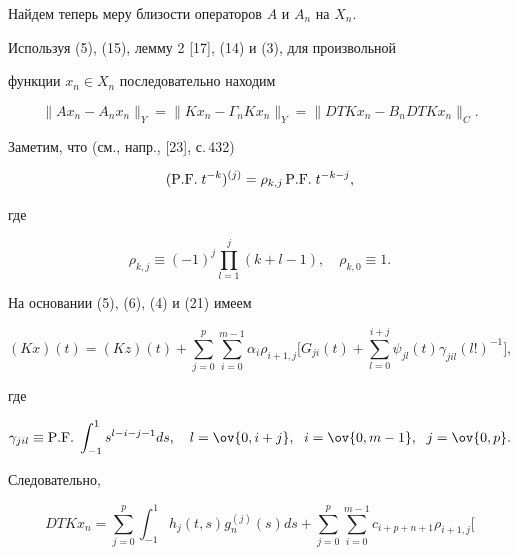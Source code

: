 \begin{pf}
 


Найдем теперь меру близости операторов $A$ и $A_n$ на $X_n$. 


Используя (5), (15), лемму 2 [17], (14) и (3), для произвольной 


функции $x_n\in X_n$ последовательно находим 


\begin{equation} 


\|Ax_n-A_n x_n\|_Y=\|K x_n-\Gamma_n K x_n\|_Y= 


\|D T K x_n-B_n D T K x_n\|_C. 


\end{equation} 


 


Заметим, что (см., напр., [23], с.\,432) 


\begin{equation} 


(\PF t^{-k})^{(j)}=\rho_{k,j}\,\PF t^{-k-j}, 


\end{equation} 


где 


$$ 


\rho_{k,j}\equiv(-1)^j\prod^j_{l=1}(k+l-1),\quad \rho_{k,0}\equiv1. 


$$ 


 


На основании (5), (6), (4) и (21) имеем 


$$ 


(K x)(t)=(K z)(t)+\sum^p_{j=0}\sum^{m-1}_{i=0}\alpha_i\rho_{i+1,j} 


\bigg[G_{j i}(t)+\sum^{i+j}_{l=0}\psi_{j l}(t)\gamma_{j i l} 


(l!)^{-1}\bigg], 


$$ 


где 


$$ 


\gamma_{j i l}\equiv\PF\int^1_{-1}s^{l-i-j-1}ds,\quad 


l=\ov{0,i+j},\ \; i=\ov{0,m-1},\ \; j=\ov{0,p}. 


$$ 


Следовательно, 


\begin{equation} 


D T K x_n=\sum^p_{j=0}\int^1_{-1}h_j(t,s)g^{(j)}_n(s)d s+ 


\sum^p_{j=0}\sum^{m-1}_{i=0}c_{i+p+n+1}\rho_{i+1,j}\bigg[ 



\end{equation}
\end{pf}
